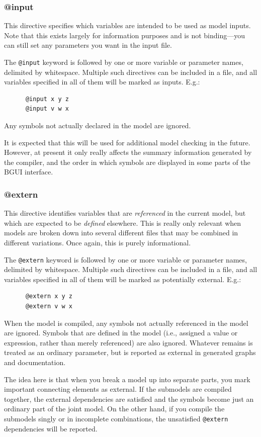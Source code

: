\documentclass[a4paper,11pt]{article}
\begin{document}
\subsubsection{@input}\label{at:input}
This directive specifies which variables are intended to be used as model inputs. Note that this exists largely for information purposes and is not binding---you can still set any parameters you want in the input file.

The \texttt{@input} keyword is followed by one or more variable or parameter names, delimited by whitespace. Multiple such directives can be included in a file, and all variables specified in all of them will be marked as inputs. E.g.:
\begin{verbatim}
      @input x y z
      @input v w x
\end{verbatim}
Any symbols not actually declared in the model are ignored.

It is expected that this will be used for additional model checking in the future. However, at present it only really affects the summary information generated by the compiler, and the order in which symbols are displayed in some parts of the BGUI interface.

\subsubsection{@extern}\label{at:extern}
This directive identifies variables that are \textit{referenced} in the current model, but which are expected to be \textit{defined} elsewhere. This is really only relevant when models are broken down into several different files that may be combined in different variations. Once again, this is purely informational.

The \texttt{@extern} keyword is followed by one or more variable or parameter names, delimited by whitespace. Multiple such directives can be included in a file, and all variables specified in all of them will be marked as potentially external. E.g.:
\begin{verbatim}
      @extern x y z
      @extern v w x
\end{verbatim}
When the model is compiled, any symbols not actually referenced in the model are ignored. Symbols that are defined in the model (i.e., assigned a value or expression, rather than merely referenced) are also ignored. Whatever remains is treated as an ordinary parameter, but is reported as external in generated graphs and documentation.

The idea here is that when you break a model up into separate parts, you mark important connecting elements as external. If the submodels are compiled together, the external dependencies are satisfied and the symbols become just an ordinary part of the joint model. On the other hand, if you compile the submodels singly or in incomplete combinations, the unsatisfied \texttt{@extern} dependencies will be reported.
\end{document}

